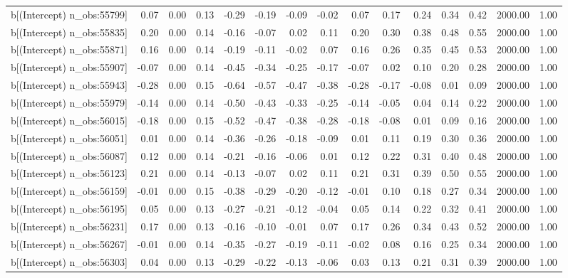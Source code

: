 \begin{table}[ht]
\begin{tabular}{rrrrrrrrrrrrrrr}
  b[(Intercept) n\_obs:55799] & 0.07 & 0.00 & 0.13 & -0.29 & -0.19 & -0.09 & -0.02 & 0.07 & 0.17 & 0.24 & 0.34 & 0.42 & 2000.00 & 1.00 \\ 
  b[(Intercept) n\_obs:55835] & 0.20 & 0.00 & 0.14 & -0.16 & -0.07 & 0.02 & 0.11 & 0.20 & 0.30 & 0.38 & 0.48 & 0.55 & 2000.00 & 1.00 \\ 
  b[(Intercept) n\_obs:55871] & 0.16 & 0.00 & 0.14 & -0.19 & -0.11 & -0.02 & 0.07 & 0.16 & 0.26 & 0.35 & 0.45 & 0.53 & 2000.00 & 1.00 \\ 
  b[(Intercept) n\_obs:55907] & -0.07 & 0.00 & 0.14 & -0.45 & -0.34 & -0.25 & -0.17 & -0.07 & 0.02 & 0.10 & 0.20 & 0.28 & 2000.00 & 1.00 \\ 
  b[(Intercept) n\_obs:55943] & -0.28 & 0.00 & 0.15 & -0.64 & -0.57 & -0.47 & -0.38 & -0.28 & -0.17 & -0.08 & 0.01 & 0.09 & 2000.00 & 1.00 \\ 
  b[(Intercept) n\_obs:55979] & -0.14 & 0.00 & 0.14 & -0.50 & -0.43 & -0.33 & -0.25 & -0.14 & -0.05 & 0.04 & 0.14 & 0.22 & 2000.00 & 1.00 \\ 
  b[(Intercept) n\_obs:56015] & -0.18 & 0.00 & 0.15 & -0.52 & -0.47 & -0.38 & -0.28 & -0.18 & -0.08 & 0.01 & 0.09 & 0.16 & 2000.00 & 1.00 \\ 
  b[(Intercept) n\_obs:56051] & 0.01 & 0.00 & 0.14 & -0.36 & -0.26 & -0.18 & -0.09 & 0.01 & 0.11 & 0.19 & 0.30 & 0.36 & 2000.00 & 1.00 \\ 
  b[(Intercept) n\_obs:56087] & 0.12 & 0.00 & 0.14 & -0.21 & -0.16 & -0.06 & 0.01 & 0.12 & 0.22 & 0.31 & 0.40 & 0.48 & 2000.00 & 1.00 \\ 
  b[(Intercept) n\_obs:56123] & 0.21 & 0.00 & 0.14 & -0.13 & -0.07 & 0.02 & 0.11 & 0.21 & 0.31 & 0.39 & 0.50 & 0.55 & 2000.00 & 1.00 \\ 
  b[(Intercept) n\_obs:56159] & -0.01 & 0.00 & 0.15 & -0.38 & -0.29 & -0.20 & -0.12 & -0.01 & 0.10 & 0.18 & 0.27 & 0.34 & 2000.00 & 1.00 \\ 
  b[(Intercept) n\_obs:56195] & 0.05 & 0.00 & 0.13 & -0.27 & -0.21 & -0.12 & -0.04 & 0.05 & 0.14 & 0.22 & 0.32 & 0.41 & 2000.00 & 1.00 \\ 
  b[(Intercept) n\_obs:56231] & 0.17 & 0.00 & 0.13 & -0.16 & -0.10 & -0.01 & 0.07 & 0.17 & 0.26 & 0.34 & 0.43 & 0.52 & 2000.00 & 1.00 \\ 
  b[(Intercept) n\_obs:56267] & -0.01 & 0.00 & 0.14 & -0.35 & -0.27 & -0.19 & -0.11 & -0.02 & 0.08 & 0.16 & 0.25 & 0.34 & 2000.00 & 1.00 \\ 
  b[(Intercept) n\_obs:56303] & 0.04 & 0.00 & 0.13 & -0.29 & -0.22 & -0.13 & -0.06 & 0.03 & 0.13 & 0.21 & 0.31 & 0.39 & 2000.00 & 1.00 \\ 

\end{tabular}
\end{table}
